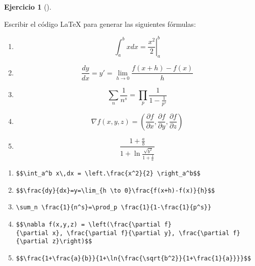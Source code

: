 \documentclass[
  a4paper,
]{scrreport}
\theoremstyle{definition}
\newtheorem{exercise}{Ejercicio}[chapter]
\theoremstyle{remark}
\begin{document}
\begin{exercise}[]\protect\hypertarget{exr-formulas-basicas}{}\label{exr-formulas-basicas}

Escribir el código LaTeX para generar las siguientes fórmulas:

\begin{enumerate}
\def\labelenumi{\alph{enumi}.}
\item
  \[\int_a^b x dx = \left.\frac{x^2}{2} \right|_a^b\]
\item
  \[\frac{dy}{dx}=y'=\lim_{h \to 0}\frac{f(x+h)-f(x)}{h}\]
\item
  \[\sum_n \frac{1}{n^s}=\prod_p \frac{1}{1-\frac{1}{p^s}}\]
\item
  \[\nabla f(x,y,z) = \left(\frac{\partial f}{\partial x}, \frac{\partial f}{\partial y}, \frac{\partial f}{\partial z}\right)\]
\item
  \[\frac{1+\frac{a}{b}}{1+\ln{\frac{\sqrt{b^2}}{1+\frac{1}{a}}}}\]
\end{enumerate}

\end{exercise}

\begin{tcolorbox}[enhanced jigsaw, left=2mm, colbacktitle=quarto-callout-tip-color!10!white, toprule=.15mm, coltitle=black, leftrule=.75mm, arc=.35mm, colback=white, opacitybacktitle=0.6, rightrule=.15mm, colframe=quarto-callout-tip-color-frame, title=\textcolor{quarto-callout-tip-color}{\faLightbulb}\hspace{0.5em}{Solución}, bottomrule=.15mm, breakable, opacityback=0, bottomtitle=1mm, toptitle=1mm, titlerule=0mm]

\begin{enumerate}
\def\labelenumi{\alph{enumi}.}
\item
  \texttt{\$\$\textbackslash{}int\_a\^{}b\ x\textbackslash{},dx\ =\ \textbackslash{}left.\textbackslash{}frac\{x\^{}2\}\{2\}\ \textbackslash{}right\textbar{}\_a\^{}b\$\$}
\item
  \texttt{\$\$\textbackslash{}frac\{dy\}\{dx\}=y\textquotesingle{}=\textbackslash{}lim\_\{h\ \textbackslash{}to\ 0\}\textbackslash{}frac\{f(x+h)-f(x)\}\{h\}\$\$}
\item
  \texttt{\textbackslash{}sum\_n\ \textbackslash{}frac\{1\}\{n\^{}s\}=\textbackslash{}prod\_p\ \textbackslash{}frac\{1\}\{1-\textbackslash{}frac\{1\}\{p\^{}s\}\}}
\item
  \texttt{\$\$\textbackslash{}nabla\ f(x,y,z)\ =\ \textbackslash{}left(\textbackslash{}frac\{\textbackslash{}partial\ f\}\{\textbackslash{}partial\ x\},\ \textbackslash{}frac\{\textbackslash{}partial\ f\}\{\textbackslash{}partial\ y\},\ \textbackslash{}frac\{\textbackslash{}partial\ f\}\{\textbackslash{}partial\ z\}\textbackslash{}right)\$\$}
\item
  \texttt{\$\$\textbackslash{}frac\{1+\textbackslash{}frac\{a\}\{b\}\}\{1+\textbackslash{}ln\{\textbackslash{}frac\{\textbackslash{}sqrt\{b\^{}2\}\}\{1+\textbackslash{}frac\{1\}\{a\}\}\}\}\$\$}
\end{enumerate}

\end{tcolorbox}
\end{document}
